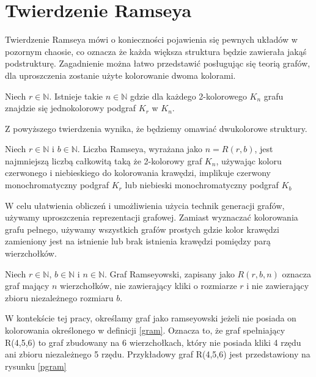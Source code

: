 \chapter{Twierdzenie Ramseya}
Twierdzenie Ramseya mówi o konieczności pojawienia się pewnych układów w pozornym chaosie, co oznacza że każda większa struktura będzie zawierała jakąś podstrukturę. Zagadnienie można łatwo przedstawić posługując się teorią grafów, dla uproszczenia zostanie użyte kolorowanie dwoma kolorami.

\begin{theorem}
Niech $r \in \mathbb{N}$. Istnieje takie $n \in \mathbb{N}$  gdzie dla każdego 2-kolorowego $\mathit{K}_{n}$ grafu znajdzie się jednokolorowy podgraf $\mathit{K}_{r}$ w $\mathit{K}_{n}$.  \cite{theory} 
\end{theorem}

Z powyższego twierdzenia wynika, że będziemy omawiać dwukolorowe struktury. 

\begin{definition}
Niech $r \in \mathbb{N}$ i $b \in \mathbb{N}$. Liczba Ramseya, wyrażana jako $n = R(r,b)$, jest najmniejszą liczbą całkowitą taką że 2-kolorowy graf $\mathit{K}_{n}$, używając koloru czerwonego i niebieskiego do kolorowania krawędzi, implikuje czerwony monochromatyczny podgraf $\mathit{K}_{r}$ lub niebieski monochromatyczny podgraf $\mathit{K}_{b}$
  \cite{theory} 
\end{definition}


W celu ułatwienia obliczeń i umożliwienia użycia technik generacji grafów, używamy uproszczenia reprezentacji grafowej. Zamiast wyznaczać kolorowania grafu pełnego, używamy wszystkich grafów prostych gdzie kolor krawędzi zamieniony jest na istnienie lub brak istnienia krawędzi pomiędzy parą wierzchołków.


\begin{definition}
Niech $r \in \mathbb{N}$, $b \in \mathbb{N}$ i $n \in \mathbb{N}$. Graf Ramseyowski, zapisany jako $R(r,b,n)$ oznacza graf mający $n$ wierzchołków, nie zawierający kliki o rozmiarze $r$ i nie zawierający zbioru niezależnego rozmiaru $b$.  \cite{theory} 
\label{gram}
\end{definition}

W kontekście tej pracy, określamy graf jako ramseyowski jeżeli nie posiada on kolorowania określonego w definicji \ref{gram}. Oznacza to, że graf spełniający R(4,5,6) to graf zbudowany na 6 wierzchołkach, który nie posiada kliki 4 rzędu ani zbioru niezależnego 5 rzędu. Przykładowy graf R(4,5,6) jest przedstawiony na rysunku \ref{pgram}

